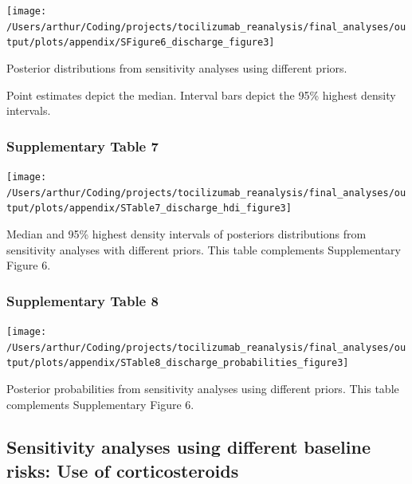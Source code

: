 \documentclass[
]{article}
\begin{document}
\begin{center}\texttt{[image: /Users/arthur/Coding/projects/tocilizumab\_reanalysis/final\_analyses/output/plots/appendix/SFigure6\_discharge\_figure3]} \end{center}

Posterior distributions from sensitivity analyses using different
priors.

Point estimates depict the median. Interval bars depict the 95\% highest
density intervals.

\newpage

\hypertarget{supplementary-table-7}{%
\subsubsection{Supplementary Table 7}\label{supplementary-table-7}}

\begin{center}\texttt{[image: /Users/arthur/Coding/projects/tocilizumab\_reanalysis/final\_analyses/output/plots/appendix/STable7\_discharge\_hdi\_figure3]} \end{center}

Median and 95\% highest density intervals of posteriors distributions
from sensitivity analyses with different priors. This table complements
Supplementary Figure 6.

\newpage

\hypertarget{supplementary-table-8}{%
\subsubsection{Supplementary Table 8}\label{supplementary-table-8}}

\begin{center}\texttt{[image: /Users/arthur/Coding/projects/tocilizumab\_reanalysis/final\_analyses/output/plots/appendix/STable8\_discharge\_probabilities\_figure3]} \end{center}

Posterior probabilities from sensitivity analyses using different
priors. This table complements Supplementary Figure 6.

\newpage

\hypertarget{sensitivity-analyses-using-different-baseline-risks-use-of-corticosteroids}{%
\subsection{Sensitivity analyses using different baseline risks: Use of
corticosteroids}\label{sensitivity-analyses-using-different-baseline-risks-use-of-corticosteroids}}
\end{document}
